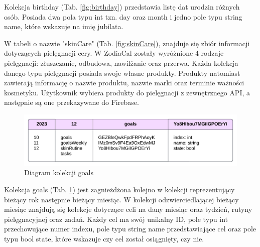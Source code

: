 Kolekcja birthday (Tab. \ref{fig:birthday}) przedstawia listę dat urodzin różnych osób. Posiada dwa pola typu int tzn. day oraz month i jedno pole typu string name, które wskazuje na imię jubilata.


W tabeli o nazwie "skinCare" (Tab. \ref{fig:skinCare}), znajduje się zbiór informacji dotyczących pielęgnacji cery. W ZodiaCal zostały wyróżnione 4 rodzaje pielęgnacji: złuszczanie, odbudowa, nawilżanie oraz przerwa. Każda kolekcja danego typu pielęgnacji posiada swoje własne produkty. Produkty natomiast zawierają informację o nazwie produktu, nazwie marki oraz terminie ważności kosmetyku. Użytkownik wybiera produkty do pielęgnacji z zewnętrznego API, a następnie są one przekazywane do Firebase.

\begin{figure}[h]
	\centering
	\includegraphics[width=1\linewidth]{images/model_danych/goals}
	\caption{Diagram kolekcji goals}
	\label{fig:goals}
\end{figure}

Kolekcja goals (Tab. \ref{fig:goals}) jest zagnieżdżona kolejno w kolekcji reprezentujący bieżący rok następnie bieżący miesiąc. W kolekcji odzwierciedlającej bieżący miesiąc znajdują się kolekcje dotyczące celi na dany miesiąc oraz tydzień, rutyny pielęgnacyjnej oraz zadań. Każdy cel ma swój unikalny ID, pole typu int przechowujące numer indexu, pole typu string name przedstawiające cel oraz pole typu bool state, które wskazuje czy cel został osiągnięty, czy nie.

